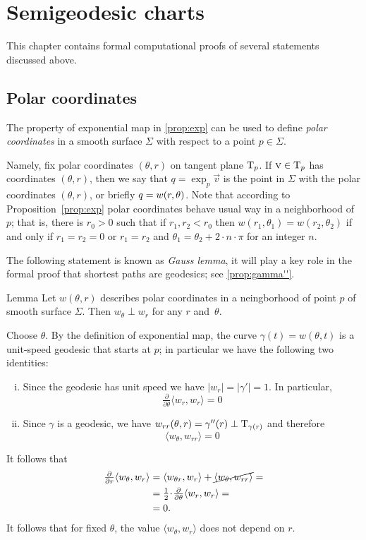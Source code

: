 \chapter{Semigeodesic charts}\label{chap:semigeodesic}

This chapter contains formal computational proofs of several statements discussed above.

\section{Polar coordinates}

The property of exponential map in \ref{prop:exp} can be used to define \emph{polar coordinates} in a smooth surface $\Sigma$ with respect to a point $p\in \Sigma$.

Namely, fix polar coordinates $(\theta,r)$ on tangent plane $\mathrm{T}_p$.
If $\textsc v\in \mathrm{T}_p$ has coordinates $(\theta,r)$,
then we say that $q=\exp_p\vec v$ is the point in $\Sigma$ with the polar coordinates $(\theta,r)$, or briefly $q\z=w(r,\theta)$.
Note that according to Proposition~\ref{prop:exp} polar coordinates behave usual way in a neighborhood of $p$;
that is, there is $r_0>0$ such that if $r_1,r_2<r_0$ then $w(r_1,\theta_1) = w(r_2,\theta_2)$ if and only if
$r_1=r_2=0$ or $r_1=r_2$ and $\theta_1=\theta_2+2\cdot n\cdot\pi$ for an integer $n$.

The following statement is known as \emph{Gauss lemma},
it will play a key role in the formal proof that shortest paths are geodesics; see \ref{prop:gamma''}.

\begin{thm}{Lemma}\label{lem:palar-perp}
Let $w(\theta,r)$ describes polar coordinates in a neingborhood of point $p$ of smooth surface $\Sigma$.
Then
$w_\theta\perp w_r$
for any $r$ and~$\theta$.
\end{thm}


Choose $\theta$.
By the definition of exponential map, the curve $\gamma(t)=w(\theta,t)$ is a unit-speed geodesic that starts at $p$;
in particular we have the following two identities:
\begin{enumerate}[(i)]
\item Since the geodesic has unit speed we have $|w_r|=|\gamma'|=1$.
In particular,
 \[
 \tfrac{\partial}{\partial \theta}
 \langle w_r,w_r\rangle=0\]
\item Since $\gamma$ is a geodesic, we have $w_{rr}(\theta,r)=\gamma''(r)\perp\mathrm{T}_{\gamma(r)}$ and therefore 
\[
\langle w_\theta, w_{rr}\rangle=0\]
\end{enumerate}
It follows that
\begin{align*}
\tfrac{\partial}{\partial r}
\langle w_\theta, w_r\rangle
&=
\langle w_{\theta r},w_r\rangle
+
\cancel{\langle w_\theta,w_{rr}\rangle}=
\\
&=
\tfrac12
\cdot 
\tfrac{\partial}{\partial \theta}
\langle w_r, w_r\rangle=
\\
&=0.
\end{align*}
It follows that for fixed $\theta$, the value 
$\langle  w_\theta, w_r\rangle$ does not depend on $r$.

